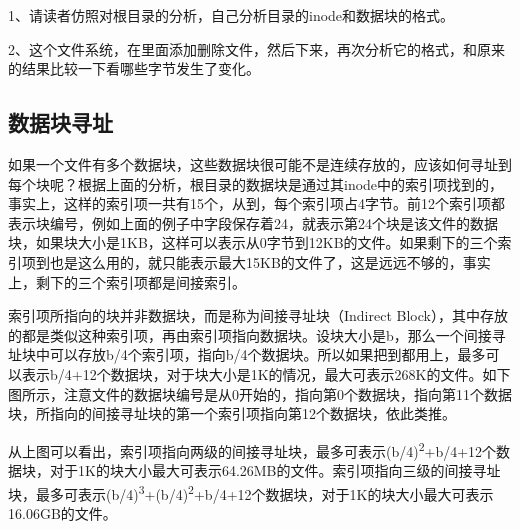 1、请读者仿照对根目录的分析，自己分析目录的inode和数据块的格式。



2、这个文件系统，在里面添加删除文件，然后下来，再次分析它的格式，和原来的结果比较一下看哪些字节发生了变化。


\subsection{数据块寻址}
%


如果一个文件有多个数据块，这些数据块很可能不是连续存放的，应该如何寻址到每个块呢？根据上面的分析，根目录的数据块是通过其inode中的索引项找到的，事实上，这样的索引项一共有15个，从到，每个索引项占4字节。前12个索引项都表示块编号，例如上面的例子中字段保存着24，就表示第24个块是该文件的数据块，如果块大小是1KB，这样可以表示从0字节到12KB的文件。如果剩下的三个索引项到也是这么用的，就只能表示最大15KB的文件了，这是远远不够的，事实上，剩下的三个索引项都是间接索引。



索引项所指向的块并非数据块，而是称为间接寻址块（Indirect Block），其中存放的都是类似这种索引项，再由索引项指向数据块。设块大小是b，那么一个间接寻址块中可以存放b/\BookSplit{}4个索引项，指向b/\BookSplit{}4个数据块。所以如果把到都用上，最多可以表示b/\BookSplit{}4+\BookSplit{}12个数据块，对于块大小是1K的情况，最大可表示268K的文件。如下图所示，注意文件的数据块编号是从0开始的，指向第0个数据块，指向第11个数据块，所指向的间接寻址块的第一个索引项指向第12个数据块，依此类推。




从上图可以看出，索引项指向两级的间接寻址块，最多可表示(b/\BookSplit{}4)\textsuperscript{2}+b/\BookSplit{}4+\BookSplit{}12个数据块，对于1K的块大小最大可表示64.\BookSplit{}26MB的文件。索引项指向三级的间接寻址块，最多可表示(b/\BookSplit{}4)\textsuperscript{3}+(b/\BookSplit{}4)\textsuperscript{2}+b/\BookSplit{}4+\BookSplit{}12个数据块，对于1K的块大小最大可表示16.\BookSplit{}06GB的文件。



